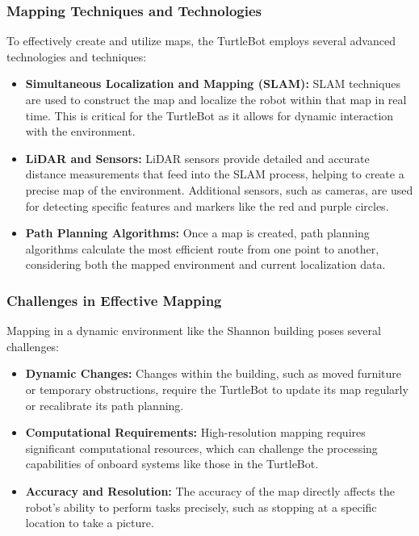\documentclass{article}
\begin{document}
	\subsubsection{Mapping Techniques and Technologies}
	To effectively create and utilize maps, the TurtleBot employs several advanced technologies and techniques:
	\begin{itemize}
		\item \textbf{Simultaneous Localization and Mapping (SLAM):} SLAM techniques are used to construct the map and localize the robot within that map in real time. This is critical for the TurtleBot as it allows for dynamic interaction with the environment.
		\item \textbf{LiDAR and Sensors:} LiDAR sensors provide detailed and accurate distance measurements that feed into the SLAM process, helping to create a precise map of the environment. Additional sensors, such as cameras, are used for detecting specific features and markers like the red and purple circles.
		\item \textbf{Path Planning Algorithms:} Once a map is created, path planning algorithms calculate the most efficient route from one point to another, considering both the mapped environment and current localization data.
	\end{itemize}
	
	\subsubsection{Challenges in Effective Mapping}
	Mapping in a dynamic environment like the Shannon building poses several challenges:
	\begin{itemize}
		\item \textbf{Dynamic Changes:} Changes within the building, such as moved furniture or temporary obstructions, require the TurtleBot to update its map regularly or recalibrate its path planning.
		\item \textbf{Computational Requirements:} High-resolution mapping requires significant computational resources, which can challenge the processing capabilities of onboard systems like those in the TurtleBot.
		\item \textbf{Accuracy and Resolution:} The accuracy of the map directly affects the robot's ability to perform tasks precisely, such as stopping at a specific location to take a picture.
	\end{itemize}
	
\end{document}
